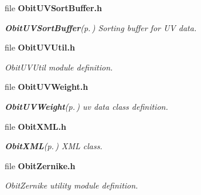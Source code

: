 \begin{CompactItemize}
\item 
file {\bf Obit\-UVSort\-Buffer.h}
\begin{CompactList}\small\item\em {\bf Obit\-UVSort\-Buffer}{\rm (p.\,\pageref{structObitUVSortBuffer})} Sorting buffer for UV data. \item\end{CompactList}

\item 
file {\bf Obit\-UVUtil.h}
\begin{CompactList}\small\item\em Obit\-UVUtil module definition. \item\end{CompactList}

\item 
file {\bf Obit\-UVWeight.h}
\begin{CompactList}\small\item\em {\bf Obit\-UVWeight}{\rm (p.\,\pageref{structObitUVWeight})} uv data class definition. \item\end{CompactList}

\item 
file {\bf Obit\-XML.h}
\begin{CompactList}\small\item\em {\bf Obit\-XML}{\rm (p.\,\pageref{structObitXML})} XML class. \item\end{CompactList}

\item 
file {\bf Obit\-Zernike.h}
\begin{CompactList}\small\item\em Obit\-Zernike utility module definition. \item\end{CompactList}

\end{CompactItemize}
